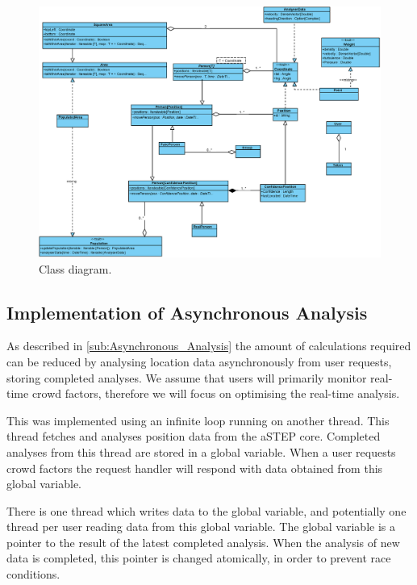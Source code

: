 \begin{figure}
\centering
\includegraphics[width=\linewidth]{figures/class.eps}
\caption{Class diagram.}
\label{fig:class}
\end{figure}

\subsection{Implementation of Asynchronous Analysis}
\label{sub:implementation_of_asynchronous_analysis}

As described in \cref{sub:Asynchronous_Analysis} the amount of calculations required can be reduced by analysing location data asynchronously from user requests, storing completed analyses. We assume that users will primarily monitor real-time crowd factors, therefore we will focus on optimising the real-time analysis.

This was implemented using an infinite loop running on another thread. This thread fetches and analyses position data from the aSTEP core. Completed analyses from this thread are stored in a global variable. When a user requests crowd factors the request handler will respond with data obtained from this global variable. 

There is one thread which writes data to the global variable, and potentially one thread per user reading data from this global variable. The global variable is a pointer to the result of the latest completed analysis. When the analysis of new data is completed, this pointer is changed atomically, in order to prevent race conditions. 

